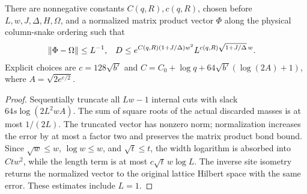 \begin{theorem}
    \label{thm:strip_mps_approximation}
    \leanok
    There are nonnegative constants $C(q,R),c(q,R)$, chosen before
    $L,w,J,\Delta,H,\Omega$, and a normalized matrix product vector $\Phi$
    along the physical column-snake ordering such that
    \begin{align}
        \|\Phi-\Omega\| & \le L^{-1},
                        & D           & \le e^{C(q,R)(1+J/\Delta)w^2}
        L^{c(q,R)\sqrt{1+J/\Delta}\,w}.\notag
    \end{align}
    Explicit choices are $c=128\sqrt{b'}$ and
    $C=C_0+\log q+64\sqrt{b'}(\log(2A)+1)$, where
    $A=\sqrt{2e^{e/2}}$.
\end{theorem}
\begin{proof}
    \leanok
    Sequentially truncate all $Lw-1$ internal cuts with slack
    $64s\log(2L^2wA)$. The sum of square roots of the actual discarded
    masses is at most $1/(2L)$. The truncated vector has nonzero norm;
    normalization increases the error by at most a factor two and preserves
    the matrix product bond bound. Since $\sqrt w\le w$, $\log w\le w$,
    and $\sqrt t\le t$, the width logarithm is absorbed into $Ctw^2$,
    while the length term is at most $c\sqrt t\,w\log L$.
    The inverse site isometry returns the normalized vector to the original
    lattice Hilbert space with the same error. These estimates include $L=1$.
\end{proof}
